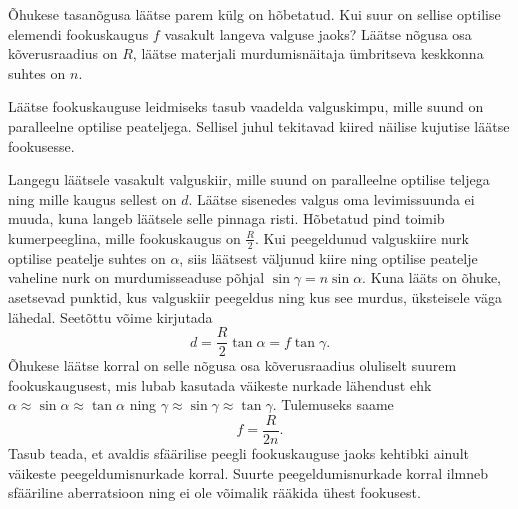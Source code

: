 
Õhukese tasanõgusa läätse parem külg on hõbetatud. Kui suur on sellise optilise elemendi fookuskaugus $f$ vasakult langeva valguse jaoks? Läätse nõgusa osa kõverusraadius on $R$, läätse materjali murdumisnäitaja ümbritseva keskkonna suhtes on $n$.

\begin{center}
\end{center}

\hint
Läätse fookuskauguse leidmiseks tasub vaadelda valguskimpu, mille suund on paralleelne optilise peateljega. Sellisel juhul tekitavad kiired näilise kujutise läätse fookusesse.

\solu
Langegu läätsele vasakult valguskiir, mille suund on paralleelne optilise teljega ning mille kaugus sellest on $d$. Läätse sisenedes valgus oma levimissuunda ei muuda, kuna langeb läätsele selle pinnaga risti. Hõbetatud pind toimib kumerpeeglina, mille fookuskaugus on $\frac{R}{2}$. Kui peegeldunud valguskiire nurk optilise peatelje suhtes on $\alpha$, siis läätsest väljunud kiire ning optilise peatelje vaheline nurk on murdumisseaduse põhjal $\sin\gamma=n\sin\alpha$. Kuna lääts on õhuke, asetsevad punktid, kus valguskiir peegeldus ning kus see murdus, üksteisele väga lähedal. Seetõttu võime kirjutada
\[ d=\frac{R}{2}\tan\alpha=f\tan\gamma. \]
Õhukese läätse korral on selle nõgusa osa kõverusraadius oluliselt suurem fookuskaugusest, mis lubab kasutada väikeste nurkade lähendust ehk $\alpha\approx\sin\alpha\approx\tan\alpha$ ning $\gamma\approx\sin\gamma\approx\tan\gamma$. Tulemuseks saame
\[ f=\frac{R}{2n}. \]
Tasub teada, et avaldis sfäärilise peegli fookuskauguse jaoks kehtibki ainult väikeste peegeldumisnurkade korral. Suurte peegeldumisnurkade korral ilmneb sfääriline aberratsioon ning ei ole võimalik rääkida ühest fookusest.

